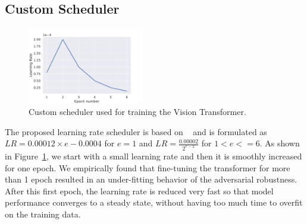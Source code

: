 \documentclass{article} %
\begin{document}
\subsection{Custom Scheduler} 
\begin{figure}
\vspace{-24pt}
\centering
    \includegraphics[width=0.45\textwidth]{src/scheduler.pdf}
    \caption{Custom scheduler used for training the Vision Transformer.}
    \label{fig:scheduler}
\end{figure}
The proposed learning rate scheduler is based on ~\cite{jeddi2020simple} and is formulated as $LR = 0.00012\times e-0.0004$ for $e=1$ and $LR = \frac{0.00002}{2^{e-2}}$ for $1<e<=6$. As shown in Figure~\ref{fig:scheduler}, we start with a small learning rate and then it is smoothly increased for one epoch. We empirically found that fine-tuning the transformer for more than 1 epoch resulted in an under-fitting behavior of the adversarial robustness. After this first epoch, the learning rate is reduced very fast so that model performance converges to a steady state, without having too much time to overfit on the training data.
\end{document}
